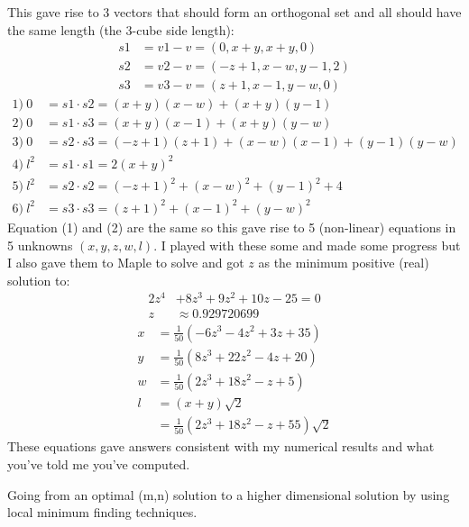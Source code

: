 \documentclass[superscriptaddress,reprint,amsmath,amssymb,aps]{revtex4-1}
\begin{document}
This gave rise to 3 vectors that should form an orthogonal
set and all should have the same length (the 3-cube side length):
\begin{align*}
     s1 & = v1 - v = (   0, x+y, x+y, 0) \\
     s2 & = v2 - v = (-z+1, x-w, y-1, 2) \\
     s3 & = v3 - v = ( z+1, x-1, y-w, 0)
\end{align*}
\begin{align*}
     1)~  0 & = s1 \cdot s2 = ( x+y)(x-w)+(x+y)(y-1)            \\
     2)~  0 & = s1 \cdot s3 = ( x+y)(x-1)+(x+y)(y-w)            \\
     3)~  0 & = s2 \cdot s3 = (-z+1)(z+1)+(x-w)(x-1)+(y-1)(y-w) \\
     4)~l^2 & = s1 \cdot s1 = 2(x+y)^2                          \\
     5)~l^2 & = s2 \cdot s2 = (-z+1)^2+(x-w)^2+(y-1)^2+4        \\
     6)~l^2 & = s3 \cdot s3 = ( z+1)^2+(x-1)^2+(y-w)^2
\end{align*}
Equation (1) and (2) are the same so this gave rise to 5 (non-linear)
equations in 5 unknowns $(x,y,z,w,l)$.  I played with these some and made
some progress but I also gave them to Maple to solve and got $z$ as the
minimum positive (real) solution to:
\begin{align*}
          2z^4 & + 8z^3 + 9z^2 + 10z - 25 = 0 \\
          z & \approx 0.929720699
\end{align*}
\begin{align*}
     x & = \frac{1}{50}(-6z^3 -  4z^2 + 3z + 35)        \\
     y & = \frac{1}{50}( 8z^3 + 22z^2 - 4z + 20)        \\
     w & = \frac{1}{50}( 2z^3 + 18z^2 -  z +  5)        \\
     l & = (x+y)\sqrt{2}                                \\
       & = \frac{1}{50}( 2z^3 + 18z^2 -  z + 55)\sqrt{2}
\end{align*}
These equations gave answers consistent with my numerical results and
what you've told me you've computed.  

\vspace{.15in}

Going from an optimal (m,n) solution to a higher dimensional solution by
using local minimum finding techniques.
\end{document}
